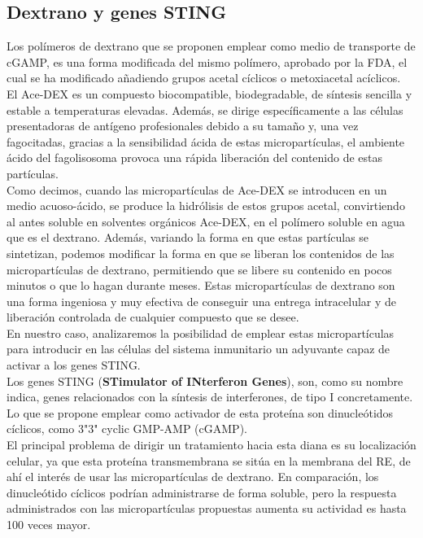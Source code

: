 \documentclass[a4paper,11pt]{article}
\begin{document}
\subsection{Dextrano y genes STING}
Los polímeros de dextrano que se proponen emplear como medio de transporte de cGAMP, es una forma modificada del mismo polímero, aprobado por la FDA, el cual se ha modificado añadiendo grupos acetal cíclicos o metoxiacetal acíclicos.
\\El Ace-DEX es un compuesto biocompatible, biodegradable, de síntesis sencilla y estable a temperaturas elevadas. Además, se dirige específicamente a las células presentadoras de antígeno profesionales debido a su tamaño y, una vez fagocitadas, gracias a la sensibilidad ácida de estas micropartículas, el ambiente ácido del fagolisosoma provoca una rápida liberación del contenido de estas partículas.
\\Como decimos, cuando las micropartículas de Ace-DEX se introducen en un medio acuoso-ácido, se produce la hidrólisis de estos grupos acetal, convirtiendo al antes soluble en solventes orgánicos Ace-DEX, en el polímero soluble en agua que es el dextrano. Además, variando la forma en que estas partículas se sintetizan, podemos modificar la forma en que se liberan los contenidos de las micropartículas de dextrano, permitiendo que se libere su contenido en pocos minutos o que lo hagan durante meses.
Estas micropartículas de dextrano son una forma ingeniosa y muy efectiva de conseguir una entrega intracelular y de liberación controlada de cualquier compuesto que se desee. 
\\En nuestro caso, analizaremos la posibilidad de emplear estas micropartículas para introducir en las células del sistema inmunitario un adyuvante capaz de activar a los genes STING.
\\Los genes STING (\textbf{STimulator of INterferon Genes}), son, como su nombre indica, genes relacionados con la síntesis de interferones, de tipo I concretamente. Lo que se propone emplear como activador de esta proteína son dinucleótidos cíclicos, como 3"3" cyclic GMP-AMP (cGAMP).
\\El principal problema de dirigir un tratamiento hacia esta diana es su localización celular, ya que esta proteína transmembrana se sitúa en la membrana del RE, de ahí el interés de usar las micropartículas de dextrano. En comparación, los dinucleótido cíclicos podrían administrarse de forma soluble, pero la respuesta administrados con las micropartículas propuestas aumenta su actividad es hasta 100 veces mayor.
\end{document}
